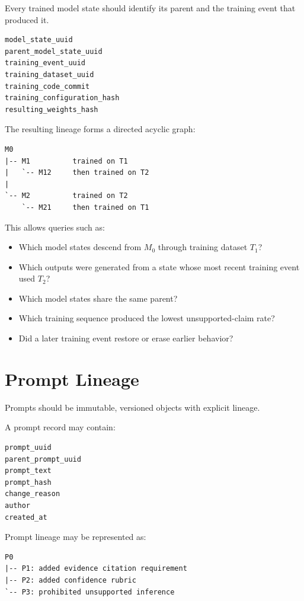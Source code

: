 \documentclass[11pt]{report}
\begin{document}
Every trained model state should identify its parent and the training event that produced it.

\begin{verbatim}
model_state_uuid
parent_model_state_uuid
training_event_uuid
training_dataset_uuid
training_code_commit
training_configuration_hash
resulting_weights_hash
\end{verbatim}

The resulting lineage forms a directed acyclic graph:

\begin{verbatim}
M0
|-- M1          trained on T1
|   `-- M12     then trained on T2
|
`-- M2          trained on T2
    `-- M21     then trained on T1
\end{verbatim}

This allows queries such as:

\begin{itemize}
  \item Which model states descend from $M_0$ through training dataset $T_1$?
  \item Which outputs were generated from a state whose most recent training event used $T_2$?
  \item Which model states share the same parent?
  \item Which training sequence produced the lowest unsupported-claim rate?
  \item Did a later training event restore or erase earlier behavior?
\end{itemize}

\chapter{Prompt Lineage}

Prompts should be immutable, versioned objects with explicit lineage.

A prompt record may contain:

\begin{verbatim}
prompt_uuid
parent_prompt_uuid
prompt_text
prompt_hash
change_reason
author
created_at
\end{verbatim}

Prompt lineage may be represented as:

\begin{verbatim}
P0
|-- P1: added evidence citation requirement
|-- P2: added confidence rubric
`-- P3: prohibited unsupported inference
\end{verbatim}
\end{document}
